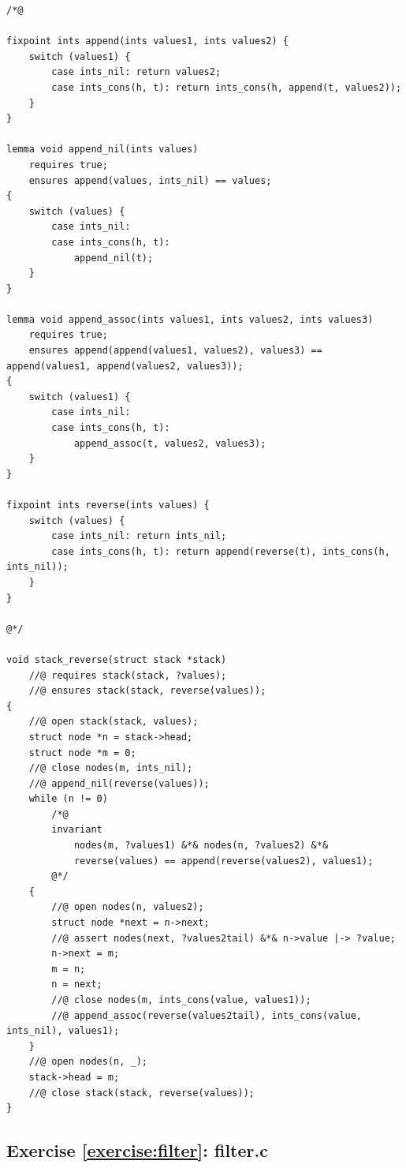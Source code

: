 \documentclass{article}
\begin{document}
\begin{lstlisting}
/*@

fixpoint ints append(ints values1, ints values2) {
    switch (values1) {
        case ints_nil: return values2;
        case ints_cons(h, t): return ints_cons(h, append(t, values2));
    }
}

lemma void append_nil(ints values)
    requires true;
    ensures append(values, ints_nil) == values;
{
    switch (values) {
        case ints_nil:
        case ints_cons(h, t):
            append_nil(t);
    }
}

lemma void append_assoc(ints values1, ints values2, ints values3)
    requires true;
    ensures append(append(values1, values2), values3) == append(values1, append(values2, values3));
{
    switch (values1) {
        case ints_nil:
        case ints_cons(h, t):
            append_assoc(t, values2, values3);
    }
}

fixpoint ints reverse(ints values) {
    switch (values) {
        case ints_nil: return ints_nil;
        case ints_cons(h, t): return append(reverse(t), ints_cons(h, ints_nil));
    }
}

@*/

void stack_reverse(struct stack *stack)
    //@ requires stack(stack, ?values);
    //@ ensures stack(stack, reverse(values));
{
    //@ open stack(stack, values);
    struct node *n = stack->head;
    struct node *m = 0;
    //@ close nodes(m, ints_nil);
    //@ append_nil(reverse(values));
    while (n != 0)
        /*@
        invariant
            nodes(m, ?values1) &*& nodes(n, ?values2) &*&
            reverse(values) == append(reverse(values2), values1);
        @*/
    {
        //@ open nodes(n, values2);
        struct node *next = n->next;
        //@ assert nodes(next, ?values2tail) &*& n->value |-> ?value;
        n->next = m;
        m = n;
        n = next;
        //@ close nodes(m, ints_cons(value, values1));
        //@ append_assoc(reverse(values2tail), ints_cons(value, ints_nil), values1);
    }
    //@ open nodes(n, _);
    stack->head = m;
    //@ close stack(stack, reverse(values));
}
\end{lstlisting}

\subsection{Exercise
\ref{exercise:filter}: filter.c}\label{solution:filter}
\end{document}
